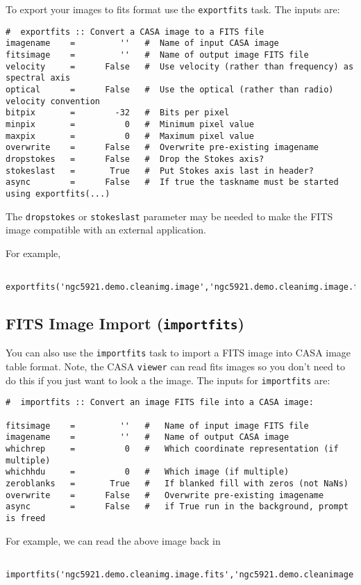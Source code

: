 To export your images to fits format use the {\tt exportfits} task.
The inputs are:
\small
\begin{verbatim}
#  exportfits :: Convert a CASA image to a FITS file
imagename    =         ''   #  Name of input CASA image
fitsimage    =         ''   #  Name of output image FITS file
velocity     =      False   #  Use velocity (rather than frequency) as spectral axis
optical      =      False   #  Use the optical (rather than radio) velocity convention
bitpix       =        -32   #  Bits per pixel
minpix       =          0   #  Minimum pixel value
maxpix       =          0   #  Maximum pixel value
overwrite    =      False   #  Overwrite pre-existing imagename
dropstokes   =      False   #  Drop the Stokes axis?
stokeslast   =       True   #  Put Stokes axis last in header?
async        =      False   #  If true the taskname must be started using exportfits(...)
\end{verbatim}
\normalsize

The {\tt dropstokes} or {\tt stokeslast} parameter may be needed to
make the FITS image compatible with an external application.

For example,
\small
\begin{verbatim}
   exportfits('ngc5921.demo.cleanimg.image','ngc5921.demo.cleanimg.image.fits')
\end{verbatim}
\normalsize


\subsection{FITS Image Import ({\tt importfits})}
\label{section:analysis.fits.import}

You can also use the {\tt importfits} task to import a FITS image into
CASA image table format.  Note, the CASA {\tt viewer} can read fits
images so you don't need to do this if you just want to look a the image.  
The inputs for {\tt importfits} are:
\small
\begin{verbatim}
#  importfits :: Convert an image FITS file into a CASA image:

fitsimage    =         ''   #   Name of input image FITS file
imagename    =         ''   #   Name of output CASA image
whichrep     =          0   #   Which coordinate representation (if multiple)
whichhdu     =          0   #   Which image (if multiple)
zeroblanks   =       True   #   If blanked fill with zeros (not NaNs)
overwrite    =      False   #   Overwrite pre-existing imagename
async        =      False   #   if True run in the background, prompt is freed
\end{verbatim}
\normalsize
For example, we can read the above image back in
\small
\begin{verbatim}
  importfits('ngc5921.demo.cleanimg.image.fits','ngc5921.demo.cleanimage')
\end{verbatim}
\normalsize

